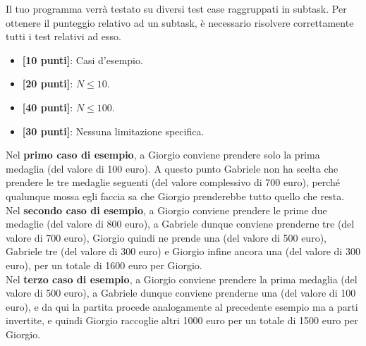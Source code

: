\Scoring
Il tuo programma verrà testato su diversi test case raggruppati in subtask.
Per ottenere il punteggio relativo ad un subtask, è necessario risolvere
correttamente tutti i test relativi ad esso.

\begin{itemize}[nolistsep,itemsep=2mm]
  \item \textbf{ [10 punti]}: Casi d'esempio.
  \item \textbf{ [20 punti]}: $N \leq 10$.
  \item \textbf{ [40 punti]}: $N \leq 100$.
  \item \textbf{ [30 punti]}: Nessuna limitazione specifica.
\end{itemize}

\Examples
\begin{example}
%
\end{example}
\begin{example}
%
\end{example}
\begin{example}
%
\end{example}


\Explanation
Nel \textbf{primo caso di esempio}, a Giorgio conviene prendere solo la prima medaglia (del valore di 100 euro). A questo punto Gabriele non ha scelta che prendere le tre medaglie seguenti (del valore complessivo di 700 euro), perché qualunque mossa egli faccia sa che Giorgio prenderebbe tutto quello che resta.\\[2mm]
Nel \textbf{secondo caso di esempio}, a Giorgio conviene prendere le prime due medaglie (del valore di 800 euro), a Gabriele dunque conviene prenderne tre (del valore di 700 euro), Giorgio quindi ne prende una (del valore di 500 euro), Gabriele tre (del valore di 300 euro) e Giorgio infine ancora una (del valore di 300 euro), per un totale di 1600 euro per Giorgio.\\[2mm]
Nel \textbf{terzo caso di esempio}, a Giorgio conviene prendere la prima medaglia (del valore di 500 euro), a Gabriele dunque conviene prenderne una (del valore di 100 euro), e da qui la partita procede analogamente al precedente esempio ma a parti invertite, e quindi Giorgio raccoglie altri 1000 euro per un totale di 1500 euro per Giorgio.
